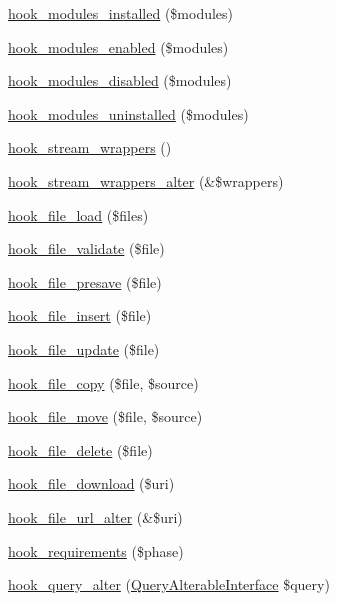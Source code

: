 \begin{DoxyCompactItemize}
\item 
\hyperlink{group__hooks_ga71b7268520567cac1a2f296c205e5227}{hook\_\-modules\_\-installed} (\$modules)
\item 
\hyperlink{group__hooks_ga0eb7c67333e0f40b4a46c0dc4c4a92f3}{hook\_\-modules\_\-enabled} (\$modules)
\item 
\hyperlink{group__hooks_ga591c577fba8ca8dc8ec17f8bf80bdc4c}{hook\_\-modules\_\-disabled} (\$modules)
\item 
\hyperlink{group__hooks_ga4f29c7343438068a922459cbe0810279}{hook\_\-modules\_\-uninstalled} (\$modules)
\item 
\hyperlink{group__hooks_ga6fadcf625a4766e7f0d97b1628b294dc}{hook\_\-stream\_\-wrappers} ()
\item 
\hyperlink{group__hooks_gab7e34e537f28b019b04ab1b1d90d52c1}{hook\_\-stream\_\-wrappers\_\-alter} (\&\$wrappers)
\item 
\hyperlink{group__hooks_ga9f6bf6919600b83a565421f6a7faf678}{hook\_\-file\_\-load} (\$files)
\item 
\hyperlink{group__hooks_gab1491b52a117229913448d787156e013}{hook\_\-file\_\-validate} (\$file)
\item 
\hyperlink{group__hooks_ga7350980f3f4679989f9c5aa2b7f0df05}{hook\_\-file\_\-presave} (\$file)
\item 
\hyperlink{group__hooks_gac40fa27583fc4cba927f486098eaa79b}{hook\_\-file\_\-insert} (\$file)
\item 
\hyperlink{group__hooks_ga604abda1f5df3f041f7ef748b9762475}{hook\_\-file\_\-update} (\$file)
\item 
\hyperlink{group__hooks_ga49e2e5f9993e98da69c3434999242711}{hook\_\-file\_\-copy} (\$file, \$source)
\item 
\hyperlink{group__hooks_ga7053514a7a923b43960b31cacfa9ce95}{hook\_\-file\_\-move} (\$file, \$source)
\item 
\hyperlink{group__hooks_gafa88683ad014451b3fbc9ca9bb80afdd}{hook\_\-file\_\-delete} (\$file)
\item 
\hyperlink{group__hooks_gab73f0e658d6630220ba7836ccd011ecc}{hook\_\-file\_\-download} (\$uri)
\item 
\hyperlink{group__hooks_ga996bb014bd4944c0e468c1525768a96c}{hook\_\-file\_\-url\_\-alter} (\&\$uri)
\item 
\hyperlink{group__hooks_ga3cff06c700ccb873cfce71fc378e7675}{hook\_\-requirements} (\$phase)
\item 
\hyperlink{group__hooks_gaf166f6375e9f7b5919d719eb91198d47}{hook\_\-query\_\-alter} (\hyperlink{interfaceQueryAlterableInterface}{QueryAlterableInterface} \$query)

\end{DoxyCompactItemize}
